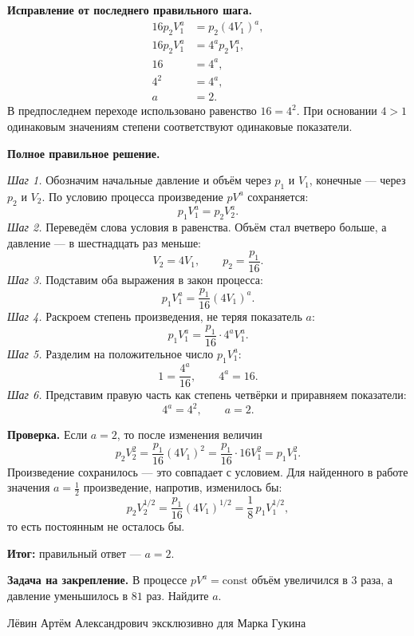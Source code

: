 \documentclass[12pt,a4paper]{article}
\begin{document}
\textbf{Исправление от последнего правильного шага.}
\begin{align*}
16p_2V_1^a&=p_2(4V_1)^a,\\
16p_2V_1^a&=4^a p_2V_1^a,\\
16&=4^a,\\
4^2&=4^a,\\
a&=2.
\end{align*}
В предпоследнем переходе использовано равенство $16=4^2$. При основании $4>1$ одинаковым значениям степени соответствуют одинаковые показатели.

\textbf{Полное правильное решение.}

\emph{Шаг 1.} Обозначим начальные давление и объём через $p_1$ и $V_1$, конечные --- через $p_2$ и $V_2$. По условию процесса произведение $pV^a$ сохраняется:
\[
p_1V_1^a=p_2V_2^a.
\]
\emph{Шаг 2.} Переведём слова условия в равенства. Объём стал вчетверо больше, а давление --- в шестнадцать раз меньше:
\[
V_2=4V_1,\qquad p_2=\frac{p_1}{16}.
\]
\emph{Шаг 3.} Подставим оба выражения в закон процесса:
\[
p_1V_1^a=\frac{p_1}{16}(4V_1)^a.
\]
\emph{Шаг 4.} Раскроем степень произведения, не теряя показатель $a$:
\[
p_1V_1^a=\frac{p_1}{16}\cdot4^aV_1^a.
\]
\emph{Шаг 5.} Разделим на положительное число $p_1V_1^a$:
\[
1=\frac{4^a}{16},\qquad 4^a=16.
\]
\emph{Шаг 6.} Представим правую часть как степень четвёрки и приравняем показатели:
\[
4^a=4^2,\qquad a=2.
\]

\textbf{Проверка.} Если $a=2$, то после изменения величин
\[
p_2V_2^2
=\frac{p_1}{16}(4V_1)^2
=\frac{p_1}{16}\cdot16V_1^2
=p_1V_1^2.
\]
Произведение сохранилось --- это совпадает с условием. Для найденного в работе значения $a=\frac12$ произведение, напротив, изменилось бы:
\[
p_2V_2^{1/2}
=\frac{p_1}{16}(4V_1)^{1/2}
=\frac18\,p_1V_1^{1/2},
\]
то есть постоянным не осталось бы.

\textcolor{teal!60!black}{\textbf{Итог:}} правильный ответ --- $\boxed{a=2}$.

\textbf{Задача на закрепление.} В процессе $pV^a=\mathrm{const}$ объём увеличился в $3$ раза, а давление уменьшилось в $81$ раз. Найдите $a$.

\vfill
\begin{center}
\footnotesize Лёвин Артём Александрович эксклюзивно для Марка Гукина
\end{center}
\end{document}
